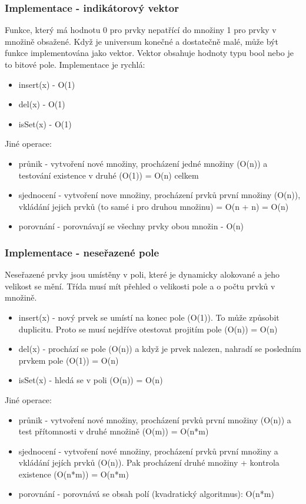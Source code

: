 \documentclass{szzclass}
\begin{document}
\subsubsection{Implementace - indikátorový vektor}
Funkce, který má hodnotu 0 pro prvky nepatřící do množiny 1 pro prvky v množině obsažené. \newline
Když je universum konečné a dostatečně malé, může být funkce implementována jako vektor. \newline
Vektor obsahuje hodnoty typu bool nebo je to bitové pole. \newline
Implementace je rychlá:
\begin{itemize}
    \item insert(x) - O(1)
    \item del(x) - O(1)
    \item isSet(x) - O(1)
\end{itemize}
Jiné operace:
\begin{itemize}
    \item průnik - vytvoření nové množiny, procházení jedné množiny (O(n)) a testování existence v druhé (O(1)) = O(n) celkem
    \item sjednocení - vytvoření nove množiny, procházení prvků první množiny (O(n)), vkládání jejich prvků (to samé i pro druhou množinu) = O(n + n) = O(n)
    \item porovnání - porovnávají se všechny prvky obou množin - O(n)
\end{itemize}
\subsubsection{Implementace - neseřazené pole}
Neseřazené prvky jsou umístěny v poli, které je dynamicky alokované a jeho velikost se mění. Třída musí mít přehled o velikosti pole
a o počtu prvků v množině.
\begin{itemize}
    \item insert(x) - nový prvek se umístí na konec pole (O(1)). To může způsobit duplicitu. Proto se musí nejdříve otestovat projitím pole (O(n)) = O(n)
    \item del(x) - prochází se pole (O(n)) a když je prvek nalezen, nahradí se posledním prvkem pole (O(1)) = O(n)
    \item isSet(x) - hledá se v poli (O(n)) = O(n)
\end{itemize}
Jiné operace:
\begin{itemize}
    \item průnik - vytvoření nové množiny, procházení prvků první množiny (O(n)) a test přítomnosti v druhé množině (O(m)) = O(n*m)
    \item sjednocení - vytvoření nové množiny, procházení prvků první množiny a vkládání jejích prvků (O(n)). Pak procházení druhé množiny + kontrola existence (O(n*m)) = O(n*m)
    \item porovnání - porovnává se obsah polí (kvadratický algoritmus): O(n*m)
\end{itemize}
\end{document}
